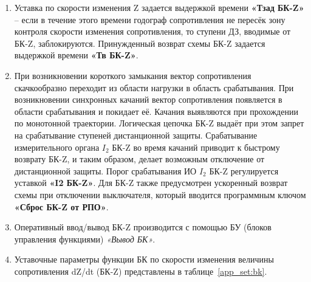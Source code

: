 \begin{enumerate}
\begin{enumerate}
\item
Уставка по скорости изменения Z задается выдержкой времени \textbf{«Тзад БК-Z»} – если в течение этого
времени годограф сопротивления не пересёк зону контроля скорости изменения сопротивления, то ступени
ДЗ, вводимые от БК-Z, заблокируются. Принужденный возврат схемы БК-Z задается выдержкой времени
\textbf{«Тв БК-Z»}.

\item
При возникновении короткого замыкания вектор сопротивления скачкообразно переходит из области
нагрузки в область срабатывания. При возникновении синхронных качаний вектор сопротивления появляется
в области срабатывания и покидает её. Качания выявляются при прохождении по монотонной траектории.
Логическая цепочка БК-Z выдаёт при этом запрет на срабатывание ступеней дистанционной защиты.
Срабатывание измерительного органа $I_2$ БК-Z во время качаний приводит к быстрому возврату БК-Z, и таким
образом, делает возможным отключение от дистанционной защиты. Порог срабатывания ИО $I_2$ БК-Z
регулируется уставкой \textbf{«I2 БК-Z»}. Для БК-Z также предусмотрен ускоренный возврат схемы при отключении 
выключателя, который вводится программным ключом \textbf{«Сброс БК-Z от РПО»}.

\item
Оперативный ввод/вывод БК-Z производится с помощью БУ (блоков управления функциями) \textit{«Вывод БК»}.

\item
Уставочные параметры функции БК по скорости изменения величины сопротивления dZ/dt (БК-Z) представлены в таблице~\ref{app_set:bk}.

\end{enumerate}

\end{enumerate}